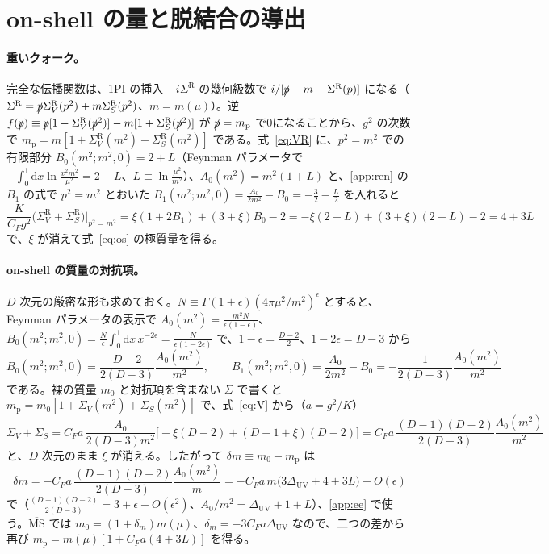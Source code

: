 \documentclass[a4paper,10pt]{ltjsarticle}
\newcommand{\dd}{\mathrm{d}}
\newcommand{\MSbar}{\overline{\mathrm{MS}}}
\newcommand{\DUV}{\Delta_{\mathrm{UV}}}
\begin{document}
\section{on-shell の量と脱結合の導出}\label{app:os}

\paragraph{重いクォーク。}完全な伝播関数は、1PI の挿入 $-i\Sigma^{\mathrm R}$ の幾何級数で $i/[\slashed p-m-\Sigma^{\mathrm R}(p)]$ になる（$\Sigma^{\mathrm R}=\slashed p\Sigma_V^{\mathrm R}(p^2)+m\Sigma_S^{\mathrm R}(p^2)$、$m=m(\mu)$）。逆 $f(\slashed p)\equiv\slashed p[1-\Sigma_V^{\mathrm R}(\slashed p^2)]-m[1+\Sigma_S^{\mathrm R}(\slashed p^2)]$ が $\slashed p=m_{\mathrm p}$ で0になることから、$g^2$ の次数で $m_{\mathrm p}=m[1+\Sigma_V^{\mathrm R}(m^2)+\Sigma_S^{\mathrm R}(m^2)]$ である。式~\eqref{eq:VR} に、$p^2=m^2$ での有限部分 $B_0(m^2;m^2,0)=2+L$（Feynman パラメータで $-\int_0^1\dd x\ln\frac{x^2m^2}{\mu^2}=2+L$、$L\equiv\ln\frac{\mu^2}{m^2}$）、$A_0(m^2)=m^2(1+L)$ と、\ref{app:ren} の $B_1$ の式で $p^2=m^2$ とおいた $B_1(m^2;m^2,0)=\frac{A_0}{2m^2}-B_0=-\frac32-\frac L2$ を入れると
\begin{equation*}
\frac{K}{C_Fg^2}\bigl(\Sigma_V^{\mathrm R}+\Sigma_S^{\mathrm R}\bigr)\Big|_{p^2=m^2}=\xi(1+2B_1)+(3+\xi)B_0-2=-\xi(2+L)+(3+\xi)(2+L)-2=4+3L
\end{equation*}
で、$\xi$ が消えて式~\eqref{eq:os} の極質量を得る。

\paragraph{on-shell の質量の対抗項。}$D$ 次元の厳密な形も求めておく。$N\equiv\Gamma(1+\epsilon)(4\pi\mu^2/m^2)^\epsilon$ とすると、Feynman パラメータの表示で $A_0(m^2)=\frac{m^2N}{\epsilon(1-\epsilon)}$、$B_0(m^2;m^2,0)=\frac N\epsilon\int_0^1\dd x\,x^{-2\epsilon}=\frac{N}{\epsilon(1-2\epsilon)}$ で、$1-\epsilon=\frac{D-2}2$、$1-2\epsilon=D-3$ から
\begin{equation*}
B_0(m^2;m^2,0)=\frac{D-2}{2(D-3)}\frac{A_0(m^2)}{m^2},\qquad B_1(m^2;m^2,0)=\frac{A_0}{2m^2}-B_0=-\frac{1}{2(D-3)}\frac{A_0(m^2)}{m^2}
\end{equation*}
である。裸の質量 $m_0$ と対抗項を含まない $\Sigma$ で書くと $m_{\mathrm p}=m_0[1+\Sigma_V(m^2)+\Sigma_S(m^2)]$ で、式~\eqref{eq:V} から（$a=g^2/K$）
\begin{equation*}
\Sigma_V+\Sigma_S=C_Fa\,\frac{A_0}{2(D-3)m^2}\bigl[-\xi(D-2)+(D-1+\xi)(D-2)\bigr]=C_Fa\,\frac{(D-1)(D-2)}{2(D-3)}\frac{A_0(m^2)}{m^2}
\end{equation*}
と、$D$ 次元のまま $\xi$ が消える。したがって $\delta m\equiv m_0-m_{\mathrm p}$ は
\begin{equation*}
\delta m=-C_Fa\,\frac{(D-1)(D-2)}{2(D-3)}\frac{A_0(m^2)}{m}=-C_Fa\,m\bigl(3\DUV+4+3L\bigr)+O(\epsilon)
\end{equation*}
で（$\frac{(D-1)(D-2)}{2(D-3)}=3+\epsilon+O(\epsilon^2)$、$A_0/m^2=\DUV+1+L$）、\ref{app:ee} で使う。$\MSbar$ では $m_0=(1+\delta_m)m(\mu)$、$\delta_m=-3C_Fa\DUV$ なので、二つの差から再び $m_{\mathrm p}=m(\mu)[1+C_Fa(4+3L)]$ を得る。
\end{document}
